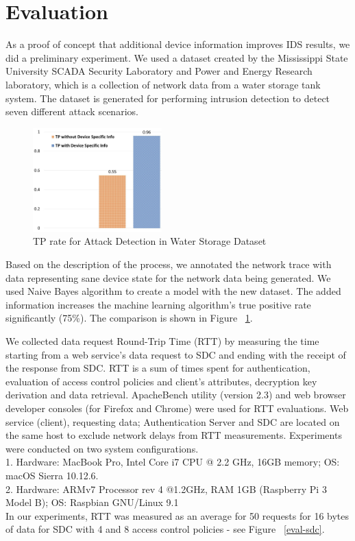 \documentclass[conference]{IEEEtran}
\begin{document}
\section{Evaluation}
As a proof of concept that additional device information improves IDS results, we did a preliminary experiment. We used a dataset \cite{c7} created by the Mississippi State University SCADA Security Laboratory and Power and Energy Research laboratory, which is a collection of network data from a water storage tank system. The dataset is generated for performing intrusion detection to detect seven different attack scenarios.
\begin{figure}[htbp]
\centering
\centerline{\includegraphics [width=.3\textwidth, height=4cm]{chart.jpg}}
\caption{TP rate for Attack Detection in Water Storage Dataset}
\label{eval-anomaly}
\end{figure}
Based on the description of the process, we annotated the network trace with data representing sane device state for the network data being generated. We used Naive Bayes algorithm to create a model with the new dataset. The added information increases the machine learning algorithm's true positive rate significantly (75\%). The comparison is shown in Figure ~\ref{eval-anomaly}.

We collected data request Round-Trip Time (RTT) by measuring the time starting from a web service's data request to SDC and ending with the receipt of the response from SDC. RTT is a sum of times spent for authentication, evaluation of access control policies and client’s attributes, decryption key derivation and data retrieval. ApacheBench utility (version 2.3) and web browser developer consoles (for Firefox and Chrome) were used for RTT evaluations. Web service (client), requesting data; Authentication Server and SDC are located on the same host to exclude network delays from RTT measurements. Experiments were conducted on two system configurations. \\ 
1. Hardware: MacBook Pro, Intel Core i7 CPU @ 2.2 GHz, 16GB memory; OS: macOS Sierra 10.12.6. \\
2. Hardware: ARMv7 Processor rev 4 @1.2GHz, RAM 1GB (Raspberry Pi 3 Model B); OS: Raspbian GNU/Linux 9.1 \\
In our experiments, RTT was measured as an average for 50 requests for 16 bytes of data for SDC with 4 and 8 access control policies - see Figure ~\ref{eval-sdc}.
\end{document}
